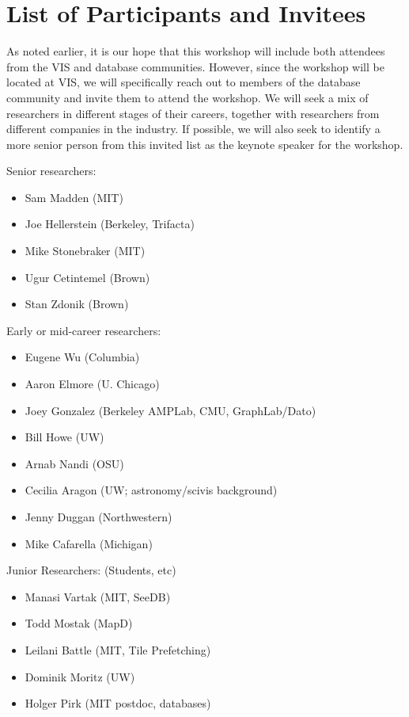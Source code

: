 \documentclass[journal]{vgtc}                %
\begin{document}
\section{List of Participants and Invitees}

As noted earlier, it is our hope that this workshop will include both
attendees from the VIS and database communities. However, since the
workshop will be located at VIS, we will specifically reach out to
members of the database community and invite them to attend the
workshop. We will seek a mix of researchers in different stages of
their careers, together with researchers from different companies in
the industry. If possible, we will also seek to identify a more senior
person from this invited list as the keynote speaker for the workshop.

Senior researchers:

\begin{itemize}
\item Sam Madden (MIT)
\item Joe Hellerstein (Berkeley, Trifacta)
\item Mike Stonebraker (MIT)
\item Ugur Cetintemel (Brown)
\item Stan Zdonik (Brown)
\end{itemize}

Early or mid-career researchers:
\begin{itemize}
\item Eugene Wu (Columbia)
\item Aaron Elmore (U. Chicago)
\item Joey Gonzalez (Berkeley AMPLab, CMU, GraphLab/Dato)
\item Bill Howe (UW)
\item Arnab Nandi (OSU)
\item Cecilia Aragon (UW; astronomy/scivis background)
\item Jenny Duggan (Northwestern)
\item Mike Cafarella (Michigan)
\end{itemize}

Junior Researchers: (Students, etc)
\begin{itemize}
\item Manasi Vartak (MIT, SeeDB)
\item Todd Mostak (MapD)
\item Leilani Battle (MIT, Tile Prefetching)
\item Dominik Moritz (UW)
\item Holger Pirk (MIT postdoc, databases)
\end{itemize}
\end{document}

